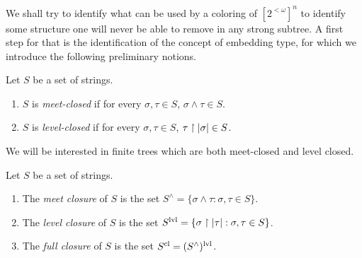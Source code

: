 We shall try to identify what can be used by a coloring of $[2^{<\omega}]^n$ to identify some structure one will never be able to remove in any strong subtree. A first step for that is the identification of the concept of embedding type, for which we introduce the following preliminary notions.

\begin{definition}
Let $S$ be a set of strings.
\begin{enumerate}
\item $S$ is \emph{meet-closed} if for every $\sigma,\tau\in S$, $\sigma \wedge \tau \in S$. 
\item $S$ is \emph{level-closed} if for every $\sigma,\tau\in S$, $\tau\upharpoonright|\sigma|\in S$.
\end{enumerate}
\end{definition}

We will be interested in finite trees which are both meet-closed and level closed. 

\begin{definition}[closure]
Let $S$ be a set of strings.
\begin{enumerate}
\item The \emph{meet closure} of $S$ is the set $S^\wedge=\{\sigma \wedge \tau:\sigma,\tau\in S\}$.
\item The \emph{level closure} of $S$ is the set $S^{\mathrm{lvl}}=\{\sigma\upharpoonright|\tau|:\sigma,\tau\in S\}$.
\item The \emph{full closure} of $S$ is the set $S^{\mathrm{cl}} = (S^\wedge)^{\mathrm{lvl}}$.
\end{enumerate}
\end{definition}

